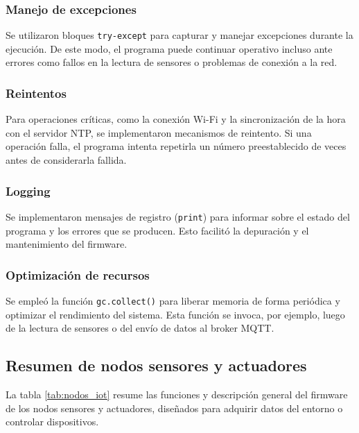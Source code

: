 \subsubsection{Manejo de excepciones}

Se utilizaron bloques \texttt{try-except} para capturar y manejar excepciones
durante la ejecución. De este modo, el programa puede continuar operativo
incluso ante errores como fallos en la lectura de sensores o problemas de
conexión a la red.

\subsubsection{Reintentos}

Para operaciones críticas, como la conexión Wi-Fi y la sincronización de la
hora con el servidor NTP, se implementaron mecanismos de reintento. Si una
operación falla, el programa intenta repetirla un número preestablecido de
veces antes de considerarla fallida.

\subsubsection{Logging}

Se implementaron mensajes de registro (\texttt{print}) para informar sobre el
estado del programa y los errores que se producen. Esto facilitó la depuración
y el mantenimiento del firmware.

\subsubsection{Optimización de recursos}

Se empleó la función \texttt{gc.collect()} para liberar memoria de forma
periódica y optimizar el rendimiento del sistema. Esta función se invoca, por
ejemplo, luego de la lectura de sensores o del envío de datos al broker MQTT.

\subsection{Resumen de nodos sensores y actuadores}

La tabla \ref{tab:nodos_iot} resume las funciones y descripción general del
firmware de los nodos sensores y actuadores, diseñados para adquirir datos del
entorno o controlar dispositivos.

